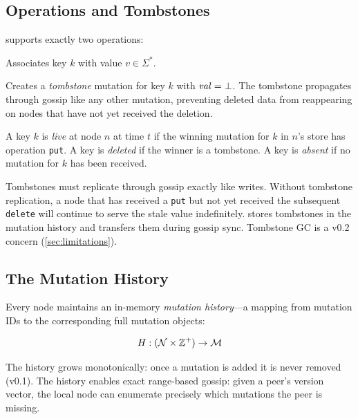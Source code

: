 \subsection{Operations and Tombstones}

\pebble{} supports exactly two operations:

\begin{description}[leftmargin=1.5em]
  \item[\texttt{put}$(k, v)$] Associates key $k$ with value $v \in \Sigma^*$.
  \item[\texttt{delete}$(k)$] Creates a \emph{tombstone} mutation for key $k$
        with $\mathit{val} = \bot$. The tombstone propagates through gossip like any
        other mutation, preventing deleted data from reappearing on nodes that
        have not yet received the deletion.
\end{description}

\begin{definition}
A key $k$ is \emph{live} at node $n$ at time $t$ if the winning mutation for $k$
in $n$'s store has operation \texttt{put}. A key is \emph{deleted} if the winner
is a tombstone. A key is \emph{absent} if no mutation for $k$ has been received.
\end{definition}

\begin{remark}
Tombstones must replicate through gossip exactly like writes. Without tombstone
replication, a node that has received a \texttt{put} but not yet received the
subsequent \texttt{delete} will continue to serve the stale value indefinitely.
\pebble{} stores tombstones in the mutation history and transfers them during
gossip sync. Tombstone GC is a v0.2 concern (\cref{sec:limitations}).
\end{remark}

\subsection{The Mutation History}

Every \pebble{} node maintains an in-memory \emph{mutation history}---a mapping
from mutation IDs to the corresponding full mutation objects:

\[
  H : (\mathcal{N} \times \mathbb{Z}^{+}) \to \mathcal{M}
\]

The history grows monotonically: once a mutation is added it is never removed
(v0.1). The history enables exact range-based gossip: given a peer's version
vector, the local node can enumerate precisely which mutations the peer is missing.

